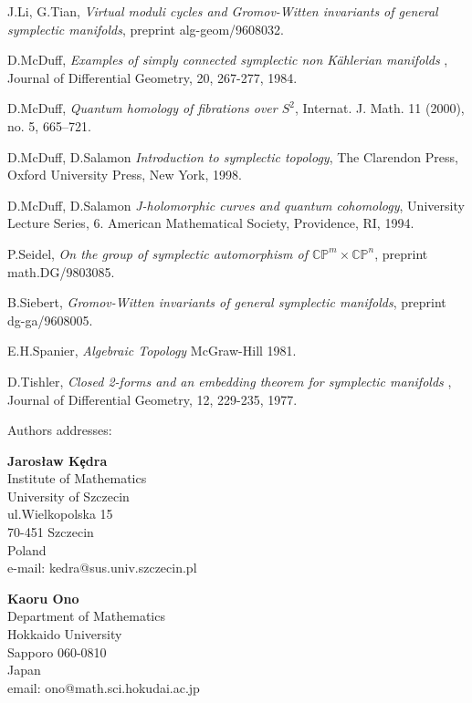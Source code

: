\documentclass[a4paper,14pt]{article}
\newcommand{\B}[1]{\mathbb #1}
\newcommand{\cp}{{\B C\B P}}
\newcommand{\BS}{{\bigskip}}
\newcommand{\NI}{{\noindent}}
\numberwithin{equation}{section}
\begin{document}
\begin{thebibliography}{ccccccc}
       J.Li, G.Tian, {\it Virtual moduli cycles and Gromov-Witten 
      invariants of general symplectic manifolds},
       preprint alg-geom/9608032.

     D.McDuff, {\it Examples of simply connected symplectic non
                    K\" ahlerian manifolds }, Journal of Differential 
     Geometry, 20, 267-277, 1984.


     D.McDuff, {\it Quantum homology of fibrations over $S^2$}, 
      Internat. J. Math. 11 (2000), no. 5, 665--721.



     D.McDuff, D.Salamon {\it Introduction to symplectic topology},
     The Clarendon Press, Oxford University Press, New York, 1998.

     D.McDuff, D.Salamon {\it J-holomorphic curves and quantum cohomology},
     University Lecture Series, 6. American Mathematical Society, 
     Providence, RI, 1994.

        P.Seidel, {\it On the group of symplectic automorphism
        of $\cp ^m\times \cp ^n$}, preprint math.DG/9803085.


       B.Siebert, {\it Gromov-Witten invariants of general symplectic manifolds},
       preprint dg-ga/9608005.

       E.H.Spanier, {\it Algebraic Topology} McGraw-Hill 1981.

       D.Tishler, {\it Closed 2-forms and an embedding theorem for 
       symplectic manifolds }, Journal of Differential Geometry, 12, 229-235, 1977. 


     

\end{thebibliography}


\NI
Authors addresses: 

\NI
{\bf Jaros{\l}aw K\c edra} \\
Institute of Mathematics \\
University of Szczecin \\
ul.Wielkopolska 15 \\
70-451 Szczecin\\
Poland\\
e-mail: kedra@sus.univ.szczecin.pl

\BS
\NI
{\bf Kaoru Ono}\\
 Department of Mathematics\\
 Hokkaido University\\
Sapporo 060-0810 \\
Japan\\
 email: ono@math.sci.hokudai.ac.jp
\end{document}
